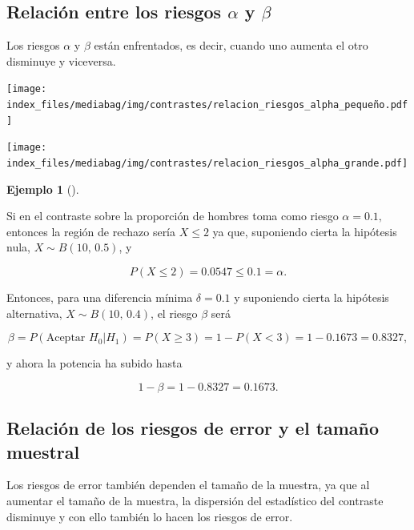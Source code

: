 \documentclass[
  a4paper,
]{scrreport}
\theoremstyle{plain}
\theoremstyle{definition}
\theoremstyle{definition}
\newtheorem{example}{Ejemplo}[chapter]
\theoremstyle{remark}
\begin{document}
\subsection{\texorpdfstring{Relación entre los riesgos \(\alpha\) y
\(\beta\)}{Relación entre los riesgos \textbackslash alpha y \textbackslash beta}}\label{relaciuxf3n-entre-los-riesgos-alpha-y-beta}

Los riesgos \(\alpha\) y \(\beta\) están enfrentados, es decir, cuando
uno aumenta el otro disminuye y viceversa.

\begin{center}
\texttt{[image: index\_files/mediabag/img/contrastes/relacion\_riesgos\_alpha\_pequeño.pdf]}
\end{center}

\begin{center}
\texttt{[image: index\_files/mediabag/img/contrastes/relacion\_riesgos\_alpha\_grande.pdf]}
\end{center}

\begin{example}[]\protect\hypertarget{exm-relacion-riesgos-alfa-beta}{}\label{exm-relacion-riesgos-alfa-beta}

Si en el contraste sobre la proporción de hombres toma como riesgo
\(\alpha=0.1,\) entonces la región de rechazo sería \(X\leq 2\) ya que,
suponiendo cierta la hipótesis nula, \(X\sim B(10,\, 0.5)\), y

\[P(X\leq 2) = 0.0547 \leq 0.1=\alpha.\]

Entonces, para una diferencia mínima \(\delta=0.1\) y suponiendo cierta
la hipótesis alternativa, \(X\sim B(10,\,0.4)\), el riesgo \(\beta\)
será

\[\beta = P(\mbox{Aceptar }H_0|H_1) = P(X\geq 3) = 1- P(X<3) = 1-0.1673 = 0.8327,\]

y ahora la potencia ha subido hasta

\[1-\beta = 1-0.8327 = 0.1673.\]

\end{example}

\subsection{Relación de los riesgos de error y el tamaño
muestral}\label{relaciuxf3n-de-los-riesgos-de-error-y-el-tamauxf1o-muestral}

Los riesgos de error también dependen el tamaño de la muestra, ya que al
aumentar el tamaño de la muestra, la dispersión del estadístico del
contraste disminuye y con ello también lo hacen los riesgos de error.
\end{document}
